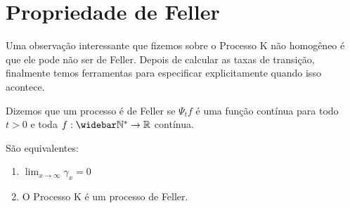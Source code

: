 
\section{Propriedade de Feller}
\label{sec:prop-feller}


Uma observação interessante que fizemos sobre o Processo K não
homogêneo é que ele pode não ser de Feller.  Depois de calcular as
taxas de transição, finalmente temos ferramentas para especificar
explicitamente quando isso acontece.

Dizemos que um processo é de Feller se $\Psi_t f$ é uma função contínua
para todo $t > 0$ e toda $f: \Nzb \to \R$ contínua.

\begin{proposicao}
  São equivalentes:
  \begin{enumerate}
  \item $\lim_{x \to \infty} \gamma_x = 0$
  \item O Processo K é um processo de Feller.
  \end{enumerate}
\end{proposicao}

